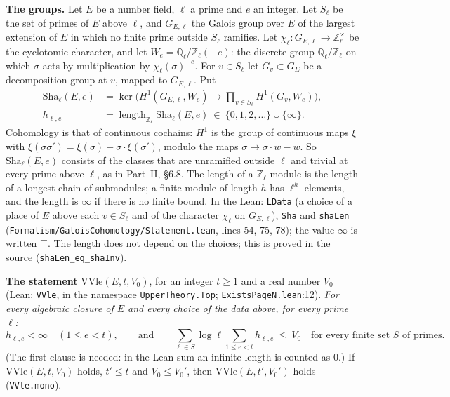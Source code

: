 \documentclass[11pt,letterpaper]{article}
\newcommand{\Z}{\mathbb Z}\newcommand{\Q}{\mathbb Q}\newcommand{\C}{\mathbb C}
\begin{document}
\textbf{The groups.} Let $E$ be a number field, $\ell$ a prime and $e$ an integer. Let $S_\ell$ be the set of
primes of $E$ above $\ell$, and $G_{E,\ell}$ the Galois group over $E$ of the largest extension of $E$ in which no
finite prime outside $S_\ell$ ramifies. Let $\chi_\ell\colon G_{E,\ell}\to\Z_\ell^\times$ be the cyclotomic
character, and let $W_e=\Q_\ell/\Z_\ell(-e)$: the discrete group $\Q_\ell/\Z_\ell$ on which $\sigma$ acts by
multiplication by $\chi_\ell(\sigma)^{-e}$. For $v\in S_\ell$ let $G_v\subset G_{E}$ be a decomposition group at
$v$, mapped to $G_{E,\ell}$. Put
\begin{equation}\label{gc:sha}
\begin{aligned}
 \mathrm{Sha}_\ell(E,e)&=\ker\Big(H^1(G_{E,\ell},W_e)\longrightarrow\prod_{v\in S_\ell}H^1(G_v,W_e)\Big),\\
 h_{\ell,e}&=\operatorname{length}_{\Z_\ell}\mathrm{Sha}_\ell(E,e)\ \in\ \{0,1,2,\dots\}\cup\{\infty\}.
\end{aligned}
\end{equation}
Cohomology is that of continuous cochains: $H^1$ is the group of continuous maps $\xi$ with
$\xi(\sigma\sigma')=\xi(\sigma)+\sigma\cdot \xi(\sigma')$, modulo the maps $\sigma\mapsto \sigma\cdot w-w$. So
$\mathrm{Sha}_\ell(E,e)$ consists of the
classes that are unramified outside $\ell$ and trivial at every prime above $\ell$, as in Part~II, \S6.8. The
length of a $\Z_\ell$-module is the length of a longest chain of submodules; a finite module of length $h$
has $\ell^{h}$ elements, and the length is $\infty$ if there is no finite bound.
In the Lean: \texttt{LData} (a choice of a place of $\overline E$ above each $v\in S_\ell$ and of the
character $\chi_\ell$ on $G_{E,\ell}$), \texttt{Sha} and \texttt{shaLen}
(\texttt{Formalism/GaloisCohomology/Statement.lean}, lines 54, 75, 78); the value $\infty$ is written $\top$.
The length does not depend on the choices; this is proved in the source (\texttt{shaLen\_eq\_}\allowbreak\texttt{shaInv}).

\textbf{The statement} $\mathrm{VVle}(E,t,V_0)$, for an integer $t\ge1$ and a real number $V_0$ (Lean: \texttt{VVle}, in the namespace
\texttt{UpperTheory.Top}; \texttt{ExistsPageN.lean}:12).
\emph{For every algebraic closure of $E$ and every choice of the data above, for every prime $\ell$:}
\begin{equation}\label{gc:vvle}
 h_{\ell,e}<\infty\quad(1\le e<t),\qquad\text{and}\qquad
 \sum_{\ell\in S}\log\ell\sum_{1\le e<t}h_{\ell,e}\ \le\ V_0\quad\text{for every finite set $S$ of primes.}
\end{equation}
(The first clause is needed: in the Lean sum an infinite length is counted as $0$.) If
$\mathrm{VVle}(E,t,V_0)$ holds, $t'\le t$ and $V_0\le V_0'$, then $\mathrm{VVle}(E,t',V_0')$ holds
(\texttt{VVle.mono}).
\end{document}
